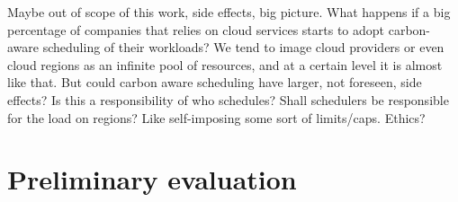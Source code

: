 Maybe out of scope of this work, side effects, big picture.
What happens if a big percentage of companies that relies on cloud services starts to adopt carbon-aware scheduling of their workloads?
We tend to image cloud providers or even cloud regions as an infinite pool of resources, and at a certain level it is almost like that. But could carbon aware scheduling have larger, not foreseen, side effects?
Is this a responsibility of who schedules? Shall schedulers be responsible for the load on regions? Like self-imposing some sort of limits/caps. Ethics?

\section{Preliminary evaluation}

\begin{comment}
for the purpose of this theses

boavizta API simulation

assumptions
- analysis limited to only cloud VM, (aligned with the scope of this theses)
- data related to GCP is not data from boavizta (even if gcp is supported in our current system) but mapped from azure and aws

limitations
- whole countries, not regions


not easily integratable in a real production system due to its quite restrictive license (AGPL 3)
it is still usable for research purposes like in this case.
\end{comment}






\newpage
